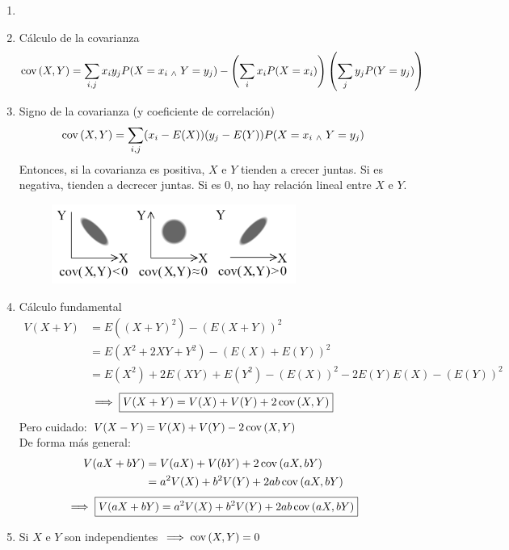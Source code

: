 
\begin{obs}
	\begin{enumerate}
		\item[]
		\item Cálculo de la covarianza
		      \[\operatorname{cov}\left(X, Y\right) = \sum_{i,j}x_iy_jP(X=x_i \; _{\wedge} \; Y=y_j) - \left(\sum_{i} x_iP(X=x_i)\right)\left(\sum_{j} y_jP(Y=y_j)\right)\]
		\item Signo de la covarianza (y coeficiente de correlación)
		      \[\operatorname{cov}\left(X, Y\right) = \sum_{i,j}(x_i-E(X))(y_j-E(Y))P(X=x_i \; _{\wedge} \; Y=y_j)\]
		      Entonces, si la covarianza es positiva, $X$ e $Y$ tienden a crecer juntas. Si
		      es negativa, tienden a decrecer juntas. Si es 0, no hay relación lineal entre
		      $X$ e $Y$.
		      \begin{figure}[htbp]
			      \centering
			      \vspace{-0.3cm}
			      \includegraphics[width=8cm]{img/covarianza.png}
			      \vspace{-0.6cm}
		      \end{figure}
		\item Cálculo fundamental
		      \begin{align*}
			      V(X+ Y) & = E((X+Y)^2)- (E(X+Y))^2                              \\
			              & = E(X^2+2XY+Y^2)- (E(X)+E(Y))^2                       \\
			              & = E(X^2)+2E(XY)+E(Y^2)- (E(X))^2-2E(Y)E(X) - (E(Y))^2
		      \end{align*}
		      \[\implies \boxed{V(X+ Y) = V(X) + V(Y) + 2\operatorname{cov}\left(X, Y\right)}\]
		      Pero cuidado: $V(X-Y)=V(X) + V(Y) -2\operatorname{cov}\left(X, Y\right)$ \\ De forma más general:
		      \begin{align*}
			      V(aX+ bY) & = V(aX) + V(bY) + 2\operatorname{cov}\left(aX, bY\right)       \\
			                & = a^2V(X) + b^2V(Y) + 2ab\operatorname{cov}\left(aX, bY\right)
		      \end{align*}
		      \[\implies \boxed{V(aX+ bY)=a^2V(X) + b^2V(Y) + 2ab\operatorname{cov}\left(aX, bY\right)}\]
		\item Si $X$ e $Y$ son independientes $\implies \operatorname{cov}\left(X, Y\right)=0$
	\end{enumerate}
\end{obs}

